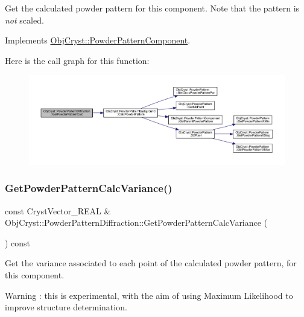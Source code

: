 Get the calculated powder pattern for this component. Note that the pattern is {\itshape not} scaled. 

Implements \mbox{\hyperlink{class_obj_cryst_1_1_powder_pattern_component_a45258e9f9b44ff019bf53aa3dfb1a305}{Obj\+Cryst\+::\+Powder\+Pattern\+Component}}.

Here is the call graph for this function\+:
\nopagebreak
\begin{figure}[H]
\begin{center}
\leavevmode
\includegraphics[width=350pt]{class_obj_cryst_1_1_powder_pattern_diffraction_a29b64d9d3d36eff816bd6dd2ce61a3c7_cgraph}
\end{center}
\end{figure}
\mbox{\label{class_obj_cryst_1_1_powder_pattern_diffraction_a779d369f39ab01390caf28eb539bfc9e}} 
\subsubsection{\texorpdfstring{GetPowderPatternCalcVariance()}{GetPowderPatternCalcVariance()}}
{\footnotesize\ttfamily const Cryst\+Vector\+\_\+\+R\+E\+AL \& Obj\+Cryst\+::\+Powder\+Pattern\+Diffraction\+::\+Get\+Powder\+Pattern\+Calc\+Variance (\begin{DoxyParamCaption}{ }\end{DoxyParamCaption}) const\hspace{0.3cm}{\ttfamily [virtual]}}

Get the variance associated to each point of the calculated powder pattern, for this component.

\begin{DoxyWarning}{Warning}
\+: this is experimental, with the aim of using Maximum Likelihood to improve structure determination. 
\end{DoxyWarning}



